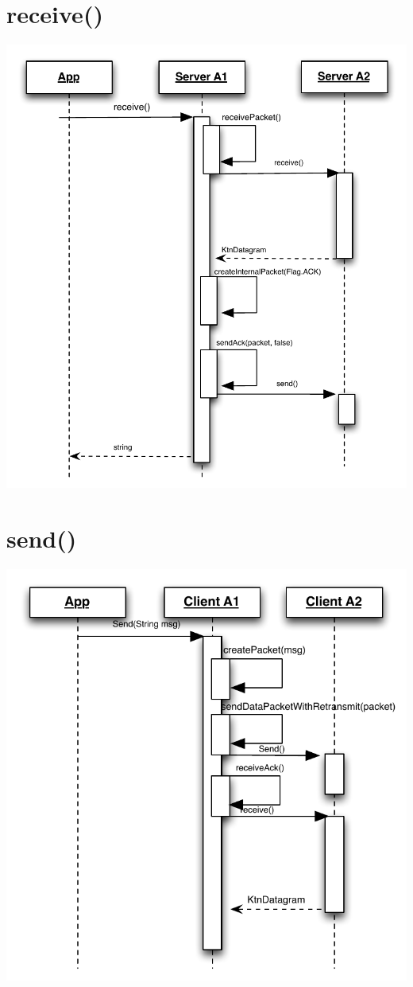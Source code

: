 \documentclass{article}
\begin{document}
\section{receive()}
\includegraphics[scale=0.8]{ktnRecv.pdf}
\section{send()}
\includegraphics[scale=0.8]{ktnSend.pdf}
\end{document}
